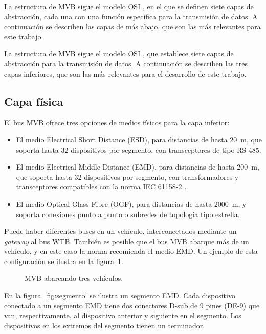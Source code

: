 La estructura de MVB sigue el modelo OSI \cite{ISO7498-1}, en el que se definen siete capas de abstracción, cada una con una función específica para la transmisión de datos. A continuación se describen las capas de más abajo, que son las más relevantes para este trabajo.

La estructura de MVB sigue el modelo OSI \cite{ISO7498-1}, que establece siete capas de abstracción para la transmisión de datos. A continuación se describen las tres capas inferiores, que son las más relevantes para el desarrollo de este trabajo.

\subsection{Capa física}

El bus MVB ofrece tres opciones de medios físicos para la capa inferior:

\begin{itemize}
\item El medio Electrical Short Distance (ESD), para distancias de hasta 20~m, que soporta hasta 32 dispositivos por segmento, con transceptores de tipo RS-485.
\item El medio Electrical Middle Distance (EMD), para distancias de hasta 200~m, que soporta hasta  32 dispositivos por segmento, con transformadores y transceptores compatibles con la norma IEC 61158-2 \cite{iec61158_2}.
\item El medio Optical Glass Fibre (OGF), para distancias de hasta 2000~m, y soporta conexiones punto a punto o subredes de topología tipo estrella.
\end{itemize}

Puede haber diferentes buses en un vehículo, interconectados mediante un \textit{gateway} al bus WTB.
También es posible que el bus MVB abarque más de un vehículo, y en este caso la norma recomienda el medio EMD.
Un ejemplo de esta configuración se ilustra en la figura~\ref{fig:emd-esd-wtb}.

\begin{figure}[htbp]
	\centering
    {
        \fontsize{9pt}{9pt}\selectfont
        
    }
	\caption[MVB abarcando tres vehículos]{MVB abarcando tres vehículos.}
    \label{fig:emd-esd-wtb}
\end{figure}

En la figura~\ref{fig:segmento} se ilustra un segmento EMD.
Cada dispositivo conectado a un segmento EMD tiene dos conectores D-sub de 9 pines (DE-9) que van, respectivamente, al dispositivo anterior y siguiente en el segmento. Los dispositivos en los extremos del segmento tienen un terminador.

